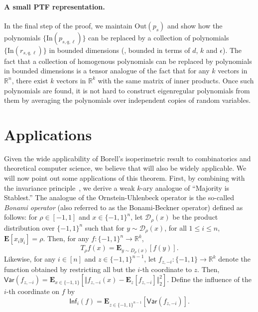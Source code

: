 \documentclass{toc}
\newcommand{\Inner}{\mathrm{In}}
\newcommand{\Outer}{\mathrm{Out}}
\begin{document}
\paragraph{A small PTF representation.}
In the final step of the proof, we maintain $\Outer(p_s)$ and show how the polynomials 
$\{\Inner(p_{s,q, \ell})\}$ can be replaced by a collection of polynomials $\{\Inner(r_{s,q, \ell})\}$ in bounded dimensions (\ie, bounded in terms of $d$, $k$ and $\epsilon$).
The fact that a collection of homogenous polynomials can be replaced by polynomials in bounded dimensions is a tensor analogue of the fact that for any $k$  vectors in $\mathbb{R}^n$, there exist $k$ vectors in $\mathbb{R}^k$ with the same matrix of inner products. Once such polynomials are found, it is not hard to construct eigenregular polynomials from them by averaging the polynomials over independent copies of random variables.  


\section{Applications} 

Given the wide applicability of Borell's isoperimetric result to combinatorics and theoretical computer science, we believe that  will also be widely applicable. We will now point out some applications of this theorem. First, by combining  with the invariance principle~\cite{MOO10}, we  
derive a weak $k$-ary analogue of ``Majority is Stablest.''
The analogue of the Ornstein-Uhlenbeck operator is the so-called
\emph{Bonami operator}
%
%
(also referred to  %
as the Bonami-Beckner operator) defined as follows: for $\rho \in [-1,1]$ and $x
\in \{-1,1\}^n$, let $\mathcal{D}_{\rho}(x)$ be the product distribution over
$\{-1,1\}^n$ such that for $y \sim \mathcal{D}_{\rho}(x)$, for all $1 \le i \le
n$, $\mathbf{E}[x_i y_i] =\rho$. 
Then, for any $f: \{-1,1\}^n \rightarrow \mathbb{R}^k$,
\[
  T_{\rho} f(x) = \mathbf{E}_{y \sim D_{\rho}(x)} [f (y)].
\]
Likewise, for any $i \in [n]$ and $z \in \{-1,1\}^{n-1}$, let
$f_{z,-i}: \{-1,1\} \rightarrow \mathbb{R}^k $ denote the function
obtained by restricting all but the $i$-{th} coordinate to $z$. Then,
$\mathsf{Var}(f_{z,-i}) = \mathbf{E}_{x \in \{-1,1\}}[\Vert
f_{z,-i}(x) - \mathbf{E}_{z}[f_{z,-i}] \Vert_2^2]$.  Define the
influence of the $i$-{th} coordinate on $f$ by
$$
\mathsf{Inf}_i(f)= \mathbf{E}_{z \in \{-1,1\}^{n-1}} [\mathsf{Var}(f_{z,-i})]. 
$$
%
\end{document}
